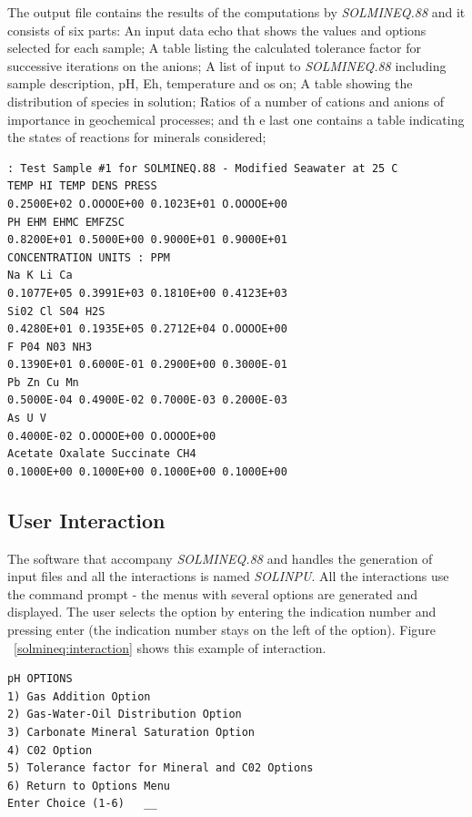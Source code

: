 The output file contains the results of the computations by \emph{SOLMINEQ.88} and it consists of six parts: An input data echo that shows the values and options selected for each sample; A table listing the calculated tolerance factor for successive iterations on the anions; A list of input to \emph{SOLMINEQ.88} including sample description, pH, Eh, temperature and os on; A table showing the distribution of species in solution; Ratios of a number of cations and anions of importance in geochemical processes; and th
e last one contains a table indicating the states of reactions for minerals considered;

\begin{minipage}[c]{0.92\textwidth}
\begin{lstlisting}[frame=single, caption=\emph{SOLMINEQ.88}'s excerpt from the output file, label=solmineq:output]
 : Test Sample #1 for SOLMINEQ.88 - Modified Seawater at 25 C
TEMP HI TEMP DENS PRESS
0.2500E+02 O.OOOOE+00 0.1023E+01 O.OOOOE+00
PH EHM EHMC EMFZSC
0.8200E+01 0.5000E+00 0.9000E+01 0.9000E+01
CONCENTRATION UNITS : PPM
Na K Li Ca
0.1077E+05 0.3991E+03 0.1810E+00 0.4123E+03
Si02 Cl S04 H2S
0.4280E+01 0.1935E+05 0.2712E+04 O.OOOOE+00
F P04 N03 NH3
0.1390E+01 0.6000E-01 0.2900E+00 0.3000E-01
Pb Zn Cu Mn
0.5000E-04 0.4900E-02 0.7000E-03 0.2000E-03
As U V
0.4000E-02 O.OOOOE+00 O.OOOOE+00
Acetate Oxalate Succinate CH4
0.1000E+00 0.1000E+00 0.1000E+00 0.1000E+00
\end{lstlisting}
\end{minipage}

\subsection{User Interaction}
The software that accompany \emph{SOLMINEQ.88} and handles the generation of input files and all the interactions is named \emph{SOLINPU}. All the interactions use the command prompt - the menus with several options are generated and displayed. The user selects the option by entering the indication number and pressing enter (the indication number stays on the left of the option). Figure ~\ref{solmineq:interaction} shows this example of interaction.

\begin{minipage}[c]{0.92\textwidth}
\begin{lstlisting}[frame=single, caption=\emph{SOLMINEQ.88}'s example of user interaction, label=solmineq:interaction]
	pH OPTIONS
1) Gas Addition Option
2) Gas-Water-Oil Distribution Option
3) Carbonate Mineral Saturation Option
4) C02 Option
5) Tolerance factor for Mineral and C02 Options
6) Return to Options Menu
Enter Choice (1-6)   __
\end{lstlisting}
\end{minipage}

